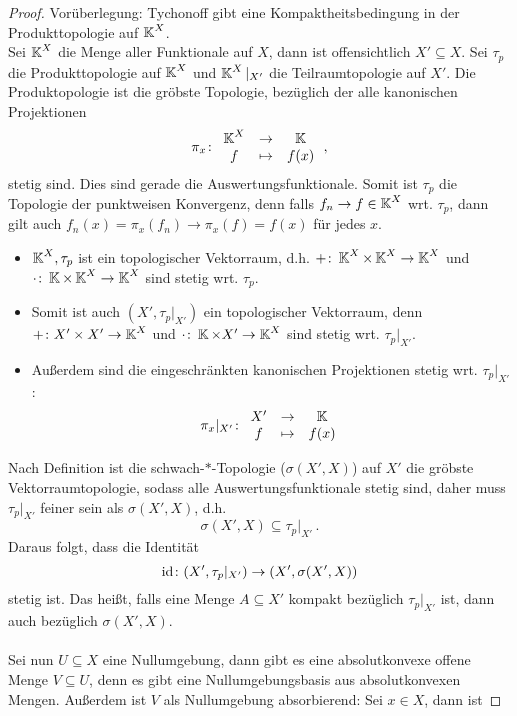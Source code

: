 \documentclass{article}
\begin{document}
	\begin{proof}
		Vorüberlegung: Tychonoff gibt eine Kompaktheitsbedingung in der Produkttopologie auf $\operatorname{\mathbb K}^X$.\\
		Sei $\operatorname{\mathbb K}^X$ die Menge aller Funktionale auf $X$, dann ist offensichtlich $X'\subseteq X$. Sei $\tau_p$ die Produkttopologie auf $\operatorname{\mathbb K}^X$ und $\operatorname{\mathbb K}^X|_{X'}$ die Teilraumtopologie auf $X'$. Die Produktopologie ist die gröbste Topologie, bezüglich der alle kanonischen Projektionen
		\[\pi_x\colon\begin{array}{clc}
			\operatorname{\mathbb K}^X&\to&\operatorname{\mathbb K}\\
			f&\mapsto& f(x)
		\end{array}\,,\]
		stetig sind. Dies sind gerade die Auswertungsfunktionale. Somit ist $\tau_p$ die Topologie der punktweisen Konvergenz, denn falls $f_n\to f\in \operatorname{\mathbb K}^X$ wrt. $\tau_p$, dann gilt auch $f_n(x)=\pi_x(f_n)\to \pi_x(f)=f(x)$ für jedes $x$.
		\begin{itemize}
			\item $\operatorname{\mathbb K}^X,\tau_p$ ist ein topologischer Vektorraum, d.h. $+\colon \operatorname{\mathbb K}^X\times \operatorname{\mathbb K}^X\to \operatorname{\mathbb K}^X$ und $\cdot\colon \operatorname{\mathbb K}\times \operatorname{\mathbb K}^X\to\operatorname{\mathbb K}^X$ sind stetig wrt. $\tau_p$.
			\item Somit ist auch $(X',\tau_p|_{X'})$ ein topologischer Vektorraum, denn $+\colon X'\times X'\to \operatorname{\mathbb K}^X$ und $\cdot \colon \operatorname{\mathbb K}\times X'\to \operatorname{\mathbb K}^X$ sind stetig wrt. $\tau_p|_{X'}$.
			\item Außerdem sind die eingeschränkten kanonischen Projektionen stetig wrt. $\tau_p|_{X'}$:
			\[\pi_x|_{X'}\colon \begin{array}{clc}
				X'&\to&\operatorname{\mathbb K}\\
				f&\mapsto&f(x)
			\end{array}\]			
		\end{itemize}
		Nach Definition ist die schwach-$*$-Topologie ($\sigma(X',X)$) auf $X'$ die gröbste Vektorraumtopologie, sodass alle Auswertungsfunktionale stetig sind, daher muss $\tau_p|_{X'}$ feiner sein als $\sigma(X',X)$, d.h.
		\[\sigma(X',X)\subseteq \tau_p|_{X'}\,.\]
		Daraus folgt, dass die Identität
		\[\operatorname{\mathrm{id}} \colon (X',\tau_p|_{X'})\to (X',\sigma(X',X))\]
		stetig ist. Das heißt, falls eine Menge $A\subseteq X'$ kompakt bezüglich $\tau_p|_{X'}$ ist, dann auch bezüglich $\sigma(X',X)$.\\
		\\
		Sei nun $U\subseteq X$ eine Nullumgebung, dann gibt es eine absolutkonvexe offene Menge $V\subseteq U$, denn es gibt eine Nullumgebungsbasis aus absolutkonvexen Mengen. Außerdem ist $V$ als Nullumgebung absorbierend: Sei $x\in X$, dann ist

\end{proof}
\end{document}
